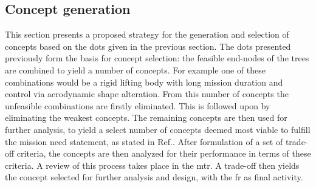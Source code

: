 
\subsection{Concept generation}
This section presents a proposed strategy for the generation and selection of concepts based on the \gls{dot}s given in the previous section. The \gls{dot}s presented previously form the basis for concept selection: the feasible end-nodes of the trees are combined to yield a number of concepts. For example one of these combinations would be a rigid lifting body with long mission duration and control via aerodynamic shape alteration. From this number of concepts the unfeasible combinations are firstly eliminated. This is followed upon by eliminating the weakest concepts. The remaining concepts are then used for further analysis, to yield a select number of concepts deemed most viable to fulfill the mission need statement, as stated in Ref.\cite{Balasooriyan2015}. After formulation of a set of trade-off criteria, the concepts are then analyzed for their performance in terms of these criteria. A review of this process takes place in the \gls{mtr}. A trade-off then yields the concept selected for further analysis and design, with the \gls{fr} as final activity.